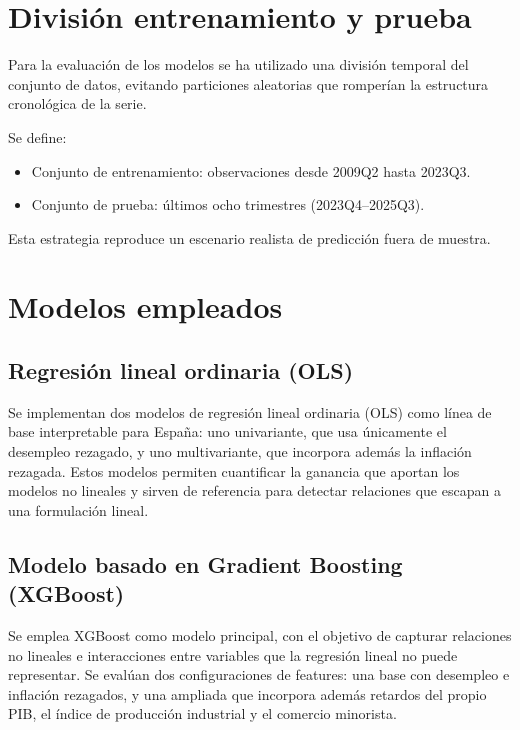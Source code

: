 \section{División entrenamiento y prueba}

Para la evaluación de los modelos se ha utilizado una división temporal del conjunto de datos, evitando particiones aleatorias que romperían la estructura cronológica de la serie.

Se define:

\begin{itemize}
\item Conjunto de entrenamiento: observaciones desde 2009Q2 hasta 2023Q3.
\item Conjunto de prueba: últimos ocho trimestres (2023Q4–2025Q3).
\end{itemize}

Esta estrategia reproduce un escenario realista de predicción fuera de muestra.

\section{Modelos empleados}

\subsection{Regresión lineal ordinaria (OLS)}

Se implementan dos modelos de regresión lineal ordinaria (OLS) como línea de base interpretable para España: uno univariante, que usa únicamente el desempleo rezagado, y uno multivariante, que incorpora además la inflación rezagada. Estos modelos permiten cuantificar la ganancia que aportan los modelos no lineales y sirven de referencia para detectar relaciones que escapan a una formulación lineal.

\subsection{Modelo basado en Gradient Boosting (XGBoost)}

Se emplea XGBoost como modelo principal, con el objetivo de capturar relaciones no lineales e interacciones entre variables que la regresión lineal no puede representar. Se evalúan dos configuraciones de features: una base con desempleo e inflación rezagados, y una ampliada que incorpora además retardos del propio PIB, el índice de producción industrial y el comercio minorista.

